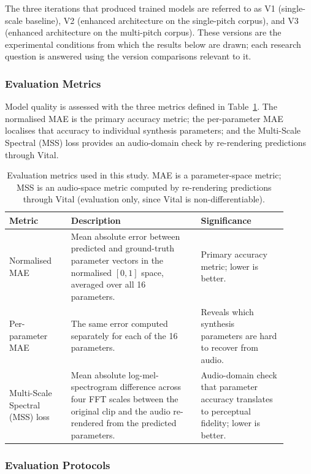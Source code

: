 \noindent
The three iterations that produced trained models are referred to as V1 (single-scale baseline), V2 (enhanced architecture on the single-pitch corpus), and V3 (enhanced architecture on the multi-pitch corpus). These versions are the experimental conditions from which the results below are drawn; each research question is answered using the version comparisons relevant to it.

\subsubsection{Evaluation Metrics}

\noindent
Model quality is assessed with the three metrics defined in Table~\ref{tab:metrics}. The normalised MAE is the primary accuracy metric; the per-parameter MAE localises that accuracy to individual synthesis parameters; and the Multi-Scale Spectral (MSS) loss provides an audio-domain check by re-rendering predictions through Vital.

\begin{table}[H]
\centering
\renewcommand{\arraystretch}{1.4}
\begin{tabular}{p{0.20\linewidth} p{0.42\linewidth} p{0.28\linewidth}}
\hline
\textbf{Metric} & \textbf{Description} & \textbf{Significance} \\
\hline
Normalised MAE &
Mean absolute error between predicted and ground-truth parameter vectors in the normalised $[0,1]$ space, averaged over all 16 parameters. &
Primary accuracy metric; lower is better. \\
Per-parameter MAE &
The same error computed separately for each of the 16 parameters. &
Reveals which synthesis parameters are hard to recover from audio. \\
Multi-Scale Spectral (MSS) loss &
Mean absolute log-mel-spectrogram difference across four FFT scales between the original clip and the audio re-rendered from the predicted parameters. &
Audio-domain check that parameter accuracy translates to perceptual fidelity; lower is better. \\
\hline
\end{tabular}
\vspace{0.3cm}
\caption{Evaluation metrics used in this study. MAE is a parameter-space metric; MSS is an audio-space metric computed by re-rendering predictions through Vital (evaluation only, since Vital is non-differentiable).}
\label{tab:metrics}
\end{table}

\subsubsection{Evaluation Protocols}

